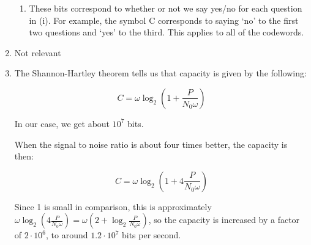 \begin{enumerate}[label=(\alph*)]
\begin{enumerate}[label=(\roman*)]
            \item
                These bits correspond to whether or not we say yes/no for each question in (i). For example, the symbol C corresponds to saying `no' to the first two questions and `yes' to the third. This applies to all of the codewords.


            
        \end{enumerate}

    \item
        Not relevant

    \item

        The Shannon-Hartley theorem tells us that capacity is given by the following:

        \[
            C = \omega \log_2 (1 + \frac{P}{N_0 \omega})
        \] 

        In our case, we get about $10^7$ bits.

        When the signal to noise ratio is about four times better, the capacity is then:

        \[
            C = \omega \log_2 (1 + 4\frac{P}{N_0 \omega})
        \] 

        Since 1 is small in comparison, this is approximately $\omega \log_2(4 \frac{P}{N_0 \omega}) = \omega(2 + \log_2 \frac{P}{N_0 \omega})$, so the capacity is  increased by a factor of $2 \cdot 10^6$, to around $1.2 \cdot 10^7$ bits per second.
    



    
    \end{enumerate}


